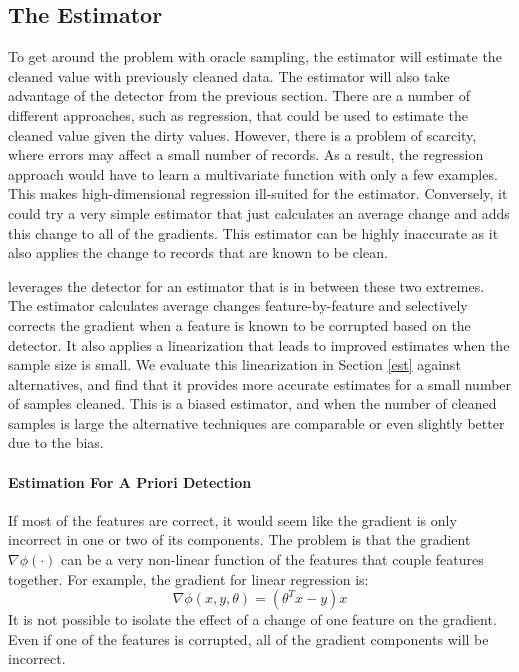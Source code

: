 
\subsection{The Estimator}\label{sampling}
To get around the problem with oracle sampling, the estimator will estimate the cleaned value with previously cleaned data.
The estimator will also take advantage of the detector from the previous section.
There are a number of different approaches, such as regression, that could be used to estimate the cleaned value given the dirty values.
However, there is a problem of scarcity, where errors may affect a small number of records.
As a result, the regression approach would have to learn a multivariate function with only a few examples.
This makes high-dimensional regression ill-suited for the estimator.
Conversely, it could try a very simple estimator that just calculates an average change and adds this change to all of the gradients.
This estimator can be highly inaccurate as it also applies the change to records that are known to be clean.

\sys leverages the detector for an estimator that is in between these two extremes.
The estimator calculates average changes feature-by-feature and selectively corrects the gradient when a feature is known to be corrupted based on the detector.
It also applies a linearization that leads to improved estimates when the sample size is small.
We evaluate this linearization in Section \ref{est} against alternatives, and find that it provides more accurate estimates for a small number of samples cleaned.
This is a biased estimator, and when the number of cleaned samples is large the alternative techniques are comparable or even slightly better due to the bias.

\paragraph{Estimation For A Priori Detection}
If most of the features are correct, it would seem like the gradient is only
incorrect in one or two of its components.
The problem is that the gradient $\nabla\phi(\cdot)$ can be a very non-linear function of the features that couple features together.
For example, the gradient for linear regression is:
\[
\nabla\phi(x,y,\theta) = (\theta^Tx - y)x
\]
It is not possible to isolate the effect of a change of one feature on the gradient.
Even if one of the features is corrupted, all of the gradient components will be incorrect.

